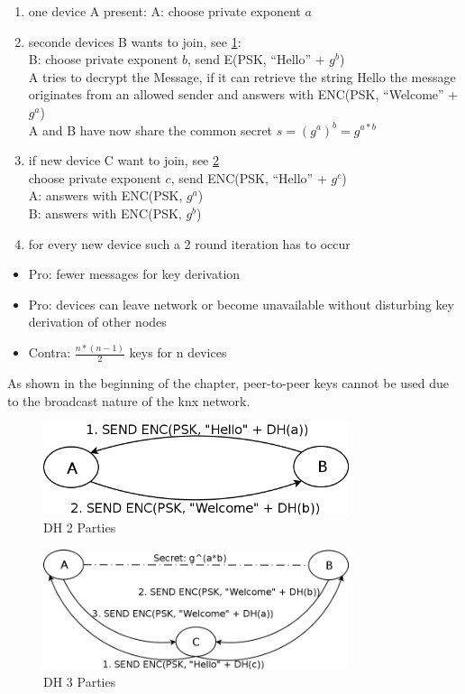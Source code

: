 \begin{enumerate}
 \item one device A present:
 A: choose private exponent $a$ 
 \item seconde devices B wants to join, see \ref{fig:dhp2}:
 \\
 B: choose private exponent $b$, send E(PSK, ``Hello'' + $g^b$)
 \\
 A tries to decrypt the Message, if it can retrieve the string Hello the message originates from an allowed sender
  and answers with ENC(PSK, ``Welcome'' + $g^a$)
 \\
 A and B have now share the common secret $s = (g^a)^b = g^{a*b}$
 \\
 \item if new device C want to join, see \ref{fig:dhp3}
 \\
 choose private exponent $c$, send ENC(PSK, ``Hello'' + $g^c$)
\\
A: answers with ENC(PSK, $g^a$)
\\
B: answers with ENC(PSK, $g^b$)
 \item for every new device such a 2 round iteration has to occur
\end{enumerate}

\begin{itemize}
 \item Pro: fewer messages for key derivation
 \item Pro: devices can leave network or become unavailable without disturbing key derivation of other nodes
 \item Contra: $\frac{n*(n-1)}{2}$ keys for n devices
\end{itemize}

As shown in the beginning of the chapter, peer-to-peer keys cannot be used due to the broadcast nature of the knx network.

\begin{figure}
    \centering
    \includegraphics[width=0.8\textwidth]{figures/dh2parties.png}
    \caption{DH 2 Parties}
    \label{fig:dhp2}
\end{figure}
\begin{figure}
    \centering
    \includegraphics[width=0.8\textwidth]{figures/dh3parties.png}
    \caption{DH 3 Parties}
    \label{fig:dhp3}
\end{figure}

